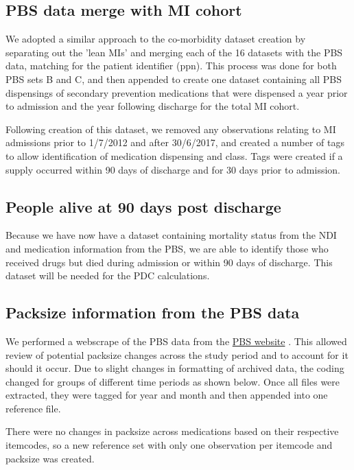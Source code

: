 \documentclass[11pt]{article}
\begin{document}
\subsection{PBS data merge with MI cohort}
We adopted a similar approach to the co-morbidity dataset creation by separating out the 'lean MIs' and merging each of the 16 datasets with the PBS data, matching for the patient identifier (ppn). This process was done for both PBS sets B and C, and then appended to create one dataset containing all PBS dispensings of secondary prevention medications that were dispensed a year prior to admission and the year following discharge for the total MI cohort. 
\color{violet}
\begin{stlog}\end{stlog}
\color{black}
Following creation of this dataset, we removed any observations relating to MI admissions prior to 1/7/2012 and after 30/6/2017, and created a number of tags to allow identification of medication dispensing and class. Tags were created if a supply occurred within 90 days of discharge and for 30 days prior to admission. 
\color{violet}
\begin{stlog}\end{stlog}
\color{black}
\subsection{People alive at 90 days post discharge}
Because we have now have a dataset containing mortality status from the NDI and medication information from the PBS, we are able to identify those who received drugs but died during admission or within 90 days of discharge. This dataset will be needed for the PDC calculations. 
\color{violet}
\begin{stlog}\end{stlog}
\color{black}
\subsection{Packsize information from the PBS data}
We performed a webscrape of the PBS data from the \color{blue} \href{https://www.pbs.gov.au/browse/downloads}{PBS website} \color{black}. This allowed review of potential packsize changes across the study period and to account for it should it occur. Due to slight changes in formatting of archived data, the coding changed for groups of different time periods as shown below. Once all files were extracted, they were tagged for year and month and then appended into one reference file. 
\color{violet}
\begin{stlog}\end{stlog}
\color{black}
There were no changes in packsize across medications based on their respective itemcodes, so a new reference set with only one observation per itemcode and packsize was created.
\color{violet}
\begin{stlog}\end{stlog}
\color{black}
\end{document}
